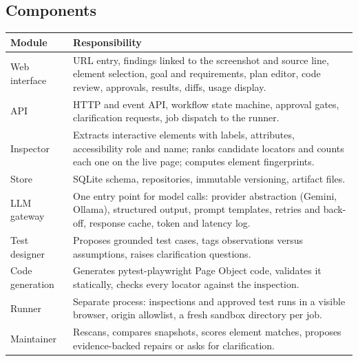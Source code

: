 \documentclass[11pt,a4paper]{article}
\begin{document}
\subsection{Components}
\begin{tabularx}{\linewidth}{@{}L{2.9cm}X@{}}
\toprule
\textbf{Module} & \textbf{Responsibility} \\
\midrule
Web interface & URL entry, findings linked to the screenshot and source line, element selection, goal and requirements, plan editor, code review, approvals, results, diffs, usage display. \\
API & HTTP and event API, workflow state machine, approval gates, clarification requests, job dispatch to the runner. \\
Inspector & Extracts interactive elements with labels, attributes, accessibility role and name; ranks candidate locators and counts each one on the live page; computes element fingerprints. \\
Store & SQLite schema, repositories, immutable versioning, artifact files. \\
LLM gateway & One entry point for model calls: provider abstraction (Gemini, Ollama), structured output, prompt templates, retries and back-off, response cache, token and latency log. \\
Test designer & Proposes grounded test cases, tags observations versus assumptions, raises clarification questions. \\
Code generation & Generates pytest-playwright Page Object code, validates it statically, checks every locator against the inspection. \\
Runner & Separate process: inspections and approved test runs in a visible browser, origin allowlist, a fresh sandbox directory per job. \\
Maintainer & Rescans, compares snapshots, scores element matches, proposes evidence-backed repairs or asks for clarification. \\
\bottomrule
\end{tabularx}

\end{document}
